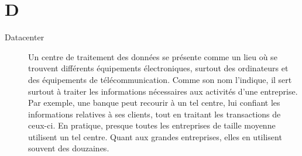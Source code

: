 \section{D}

\begin{description}
    \item[Datacenter] Un centre de traitement des données se présente comme un 
	lieu où se trouvent différents équipements électroniques, surtout des 
	ordinateurs et des équipements de télécommunication. Comme son nom 
	l'indique, il sert surtout à traiter les informations nécessaires aux 
	activités d'une entreprise. Par exemple, une banque peut recourir à un tel 
	centre, lui confiant les informations relatives à ses clients, tout en 
	traitant les transactions de ceux-ci. En pratique, presque toutes les 
	entreprises de taille moyenne utilisent un tel centre. Quant aux grandes 
	entreprises, elles en utilisent souvent des douzaines.

\end{description}
